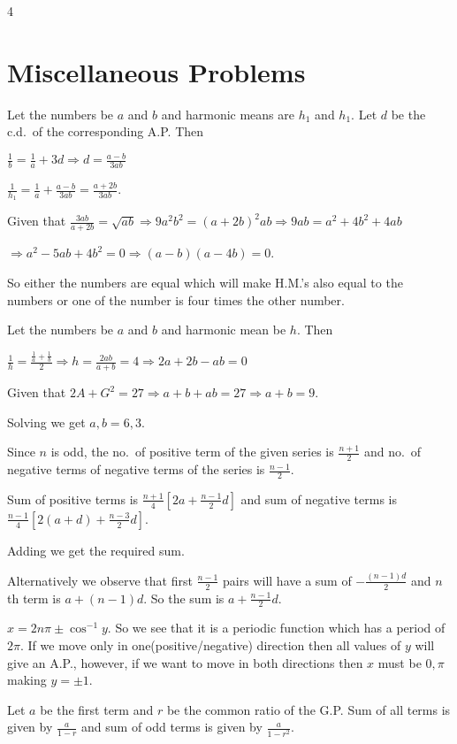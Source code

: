 4%
\chapter{Miscellaneous Problems}
\startitemize[n, 1*broad]
\item Let the numbers be $a$ and $b$ and harmonic means are $h_1$ and $h_1$. Let $d$ be the c.d.\ of the
  corresponding A.P. Then

  $\frac{1}{b} = \frac{1}{a} + 3d\Rightarrow d = \frac{a - b}{3ab}$

  $\frac{1}{h_1} = \frac{1}{a} + \frac{a - b}{3ab} = \frac{a + 2b}{3ab}$.

  Given that $\frac{3ab}{a + 2b} = \sqrt{ab}\Rightarrow 9a^2b^2 = (a + 2b)^2ab \Rightarrow 9ab = a^2 + 4b^2
  + 4ab$

  $\Rightarrow a^2 - 5ab + 4b^2 = 0 \Rightarrow (a - b)(a - 4b) = 0$.

  So either the numbers are equal which will make H.M.'s also equal to the numbers or one of the number is
  four times the other number.
\item Let the numbers be $a$ and $b$ and harmonic mean be $h$. Then

  $\frac{1}{h} = \frac{\frac{1}{a} + \frac{1}{b}}{2} \Rightarrow h = \frac{2ab}{a + b} = 4 \Rightarrow 2a +
  2b - ab = 0$

  Given that $2A + G^2 = 27 \Rightarrow a + b + ab = 27 \Rightarrow a + b = 9$.

  Solving we get $a, b = 6, 3$.
\item Since $n$ is odd, the no.\ of positive term of the given series is $\frac{n + 1}{2}$ and no.\ of
  negative terms of negative terms of the series is $\frac{n - 1}{2}$.

  Sum of positive terms is $\frac{n + 1}{4}\left[2a + \frac{n - 1}{2}d\right]$ and sum of negative terms is
  $\frac{n - 1}{4}\left[2(a + d) + \frac{n - 3}{2}d\right]$.

  Adding we get the required sum.

  Alternatively we observe that first $\frac{n- 1}{2}$ pairs will have a sum of $-\frac{(n - 1)d}{2}$ and
  $n$th term is $a + (n- 1)d$. So the sum is $a + \frac{n - 1}{2}d$.
\item $x = 2n\pi\pm \cos^{-1}y$. So we see that it is a periodic function which has a period of $2\pi$. If
  we move only in one(positive/negative) direction then all values of $y$ will give an A.P., however, if we
  want to move in both directions then $x$ must be $0, \pi$ making $y = \pm1$.
\item Let $a$ be the first term and $r$ be the common ratio of the G.P. Sum of all terms is given by
  $\frac{a}{1 - r}$ and sum of odd terms is given by $\frac{a}{1 - r^2}$.

